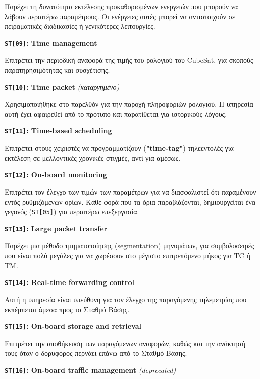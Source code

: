 \documentclass[a4paper,nobib]{tufte-book}
\begin{document}
\begin{compactitem}
		Παρέχει τη δυνατότητα εκτέλεσης προκαθορισμένων ενεργειών που μπορούν να λάβουν περαιτέρω παραμέτρους. Οι ενέργειες αυτές μπορεί να αντιστοιχούν σε πειραματικές διαδικασίες ή γενικότερες λειτουργίες.
		
		\item \textbf{\texttt{ST[09]}: Time management}
		
		Επιτρέπει την περιοδική αναφορά της τιμής του ρολογιού του CubeSat, για σκοπούς παρατηρησιμότητας και συσχέτισης.
		
		\item \textbf{\texttt{ST[10]}: Time packet} \emph{(καταργημένο)}
		
		Χρησιμοποιήθηκε στο παρελθόν για την παροχή πληροφοριών ρολογιού. Η υπηρεσία αυτή έχει αφαιρεθεί από το πρότυπο και παρατίθεται για ιστορικούς λόγους.
		
		\item \textbf{\texttt{ST[11]}: Time-based scheduling}
		
		Επιτρέπει στους χειριστές να προγραμματίζουν (\textbf{"time-tag"}) τηλεεντολές για εκτέλεση σε μελλοντικές χρονικές στιγμές, αντί για αμέσως.
		
		\item \textbf{\texttt{ST[12]}: On-board monitoring}
		
		Επιτρέπει τον έλεγχο των τιμών των παραμέτρων για να διασφαλιστεί ότι παραμένουν εντός ρυθμιζόμενων ορίων. Κάθε φορά που τα όρια παραβιάζονται, δημιουργείται ένα γεγονός (\texttt{ST[05]}) για περαιτέρω επεξεργασία.
		
		\item \textbf{\texttt{ST[13]}: Large packet transfer}
		
		Παρέχει μια μέθοδο τμηματοποίησης (segmentation) μηνυμάτων, για συμβολοσειρές που είναι πολύ μεγάλες για να χωρέσουν στο μέγιστο επιτρεπόμενο μήκος για \ac{TC} ή \ac{TM}.
		
		\item \textbf{\texttt{ST[14]}: Real-time forwarding control}
		
		Αυτή η υπηρεσία είναι υπεύθυνη για τον έλεγχο της παραγόμενης τηλεμετρίας που εκπέμπεται άμεσα προς το Σταθμό Βάσης.
		
		\item \textbf{\texttt{ST[15]}: On-board storage and retrieval}
		
		Επιτρέπει την αποθήκευση των παραγόμενων αναφορών, καθώς και την ανάκτησή τους όταν ο δορυφόρος περνάει επάνω από το Σταθμό Βάσης.
		
		\item \textbf{\texttt{ST[16]}: On-board traffic management} \emph{(deprecated)}
		

\end{compactitem}
\end{document}
